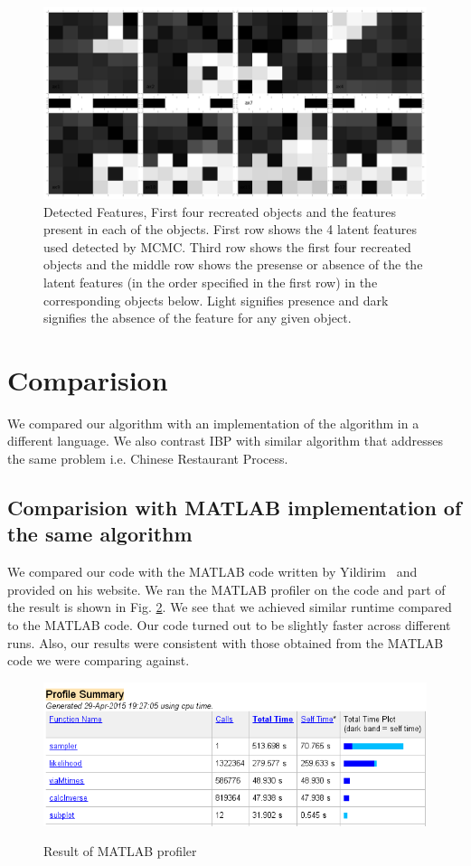 \documentclass{article}
\begin{document}
\begin{figure}
\includegraphics[width=\linewidth]{figures/Detected.png}
\caption {Detected Features, First four recreated objects and the features present in each of the objects. First row shows the 4 latent features used detected by MCMC. Third row shows the first four recreated objects and the middle row shows the presense or absence of the the latent features (in the order specified in the first row) in the corresponding objects below. Light signifies presence and dark signifies the absence of the feature for any given object.}
\label{fig:detected}
\end{figure}

\section{Comparision}
We compared our algorithm with an implementation of the algorithm in a different language. We also contrast IBP with similar algorithm that addresses the same problem i.e. Chinese Restaurant Process.
\subsection{Comparision with MATLAB implementation of the same algorithm}
We compared our code with the MATLAB code written by Yildirim~\cite{yildirimweb} and provided on his website. We ran the MATLAB profiler on the code and part of the result is shown in Fig. \ref{fig:profilematlab}. We see that we achieved similar runtime compared to the MATLAB code. Our code turned out to be slightly faster across different runs. Also, our results were consistent with those obtained from the MATLAB code we were comparing against.
\begin{figure}
\caption{Result of MATLAB profiler}
\includegraphics[width=\linewidth]{MatlabProfile.PNG}
\label{fig:profilematlab}
\end{figure}
\end{document}
